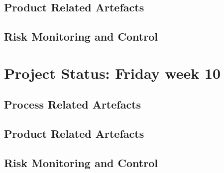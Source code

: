\documentclass{report}
\begin{document}
\subsection{Product Related Artefacts}
\subsection{Risk Monitoring and Control}
\section{Project Status: Friday week 10}
\subsection{Process Related Artefacts}
\subsection{Product Related Artefacts}
\subsection{Risk Monitoring and Control}
\end{document}
